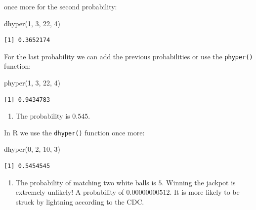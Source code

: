 \documentclass[
  letterpaper,
  DIV=11,
  numbers=noendperiod]{scrreprt}
\newenvironment{Shaded}{\begin{snugshade}}{\end{snugshade}}
\newcommand{\DecValTok}[1]{\textcolor[rgb]{0.68,0.00,0.00}{#1}}
\newcommand{\FunctionTok}[1]{\textcolor[rgb]{0.28,0.35,0.67}{#1}}
\newcommand{\NormalTok}[1]{\textcolor[rgb]{0.00,0.23,0.31}{#1}}
\providecommand{\tightlist}{%
  \setlength{\itemsep}{0pt}\setlength{\parskip}{0pt}}\usepackage{longtable,booktabs,array}
\begin{document}
once more for the second probability:

\begin{Shaded}
\begin{Highlighting}[numbers=left,,]
\FunctionTok{dhyper}\NormalTok{(}\DecValTok{1}\NormalTok{, }\DecValTok{3}\NormalTok{, }\DecValTok{22}\NormalTok{, }\DecValTok{4}\NormalTok{)}
\end{Highlighting}
\end{Shaded}

\begin{verbatim}
[1] 0.3652174
\end{verbatim}

For the last probability we can add the previous probabilities or use
the \texttt{phyper()} function:

\begin{Shaded}
\begin{Highlighting}[numbers=left,,]
\FunctionTok{phyper}\NormalTok{(}\DecValTok{1}\NormalTok{, }\DecValTok{3}\NormalTok{, }\DecValTok{22}\NormalTok{, }\DecValTok{4}\NormalTok{)}
\end{Highlighting}
\end{Shaded}

\begin{verbatim}
[1] 0.9434783
\end{verbatim}

\begin{enumerate}
\def\labelenumi{\arabic{enumi}.}
\setcounter{enumi}{1}
\tightlist
\item
  The probability is \(0.545\).
\end{enumerate}

In R we use the \texttt{dhyper()} function once more:

\begin{Shaded}
\begin{Highlighting}[numbers=left,,]
\FunctionTok{dhyper}\NormalTok{(}\DecValTok{0}\NormalTok{, }\DecValTok{2}\NormalTok{, }\DecValTok{10}\NormalTok{, }\DecValTok{3}\NormalTok{)}
\end{Highlighting}
\end{Shaded}

\begin{verbatim}
[1] 0.5454545
\end{verbatim}

\begin{enumerate}
\def\labelenumi{\arabic{enumi}.}
\setcounter{enumi}{2}
\tightlist
\item
  The probability of matching two white balls is \(5%
  \). Winning the jackpot is extremely unlikely! A probability of
  \(0.00000000512\). It is more likely to be struck by lightning
  according to the CDC.
\end{enumerate}
\end{document}
